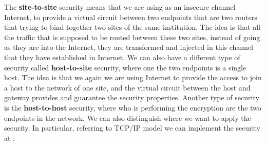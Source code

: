\documentclass[11pt]{article}
\begin{document}
The \textbf{site-to-site} security means that we are using as an insecure channel Internet, to provide a virtual circuit between two endpoints that are two routers that trying to bind together two sites of the same institution. The idea is that all the traffic that is supposed to be routed between these two sites, instead of going as they are into the Internet, they are transformed and injected in this channel that they have established in Internet. We can also have a different type of security called \textbf{host-to-site} security, where one the two endpoints is a single host. The idea is that we again we are using Internet to provide the access to join a host to the network of one site, and the virtual circuit between the host and gateway provides and guarantee the security properties. Another type of security is the \textbf{host-to-host} security, where who is performing the encryption are the two endpoints in the network. We can also distinguish where we want to apply the security. In particular, referring to TCP/IP model we can implement the security at :
\end{document}
